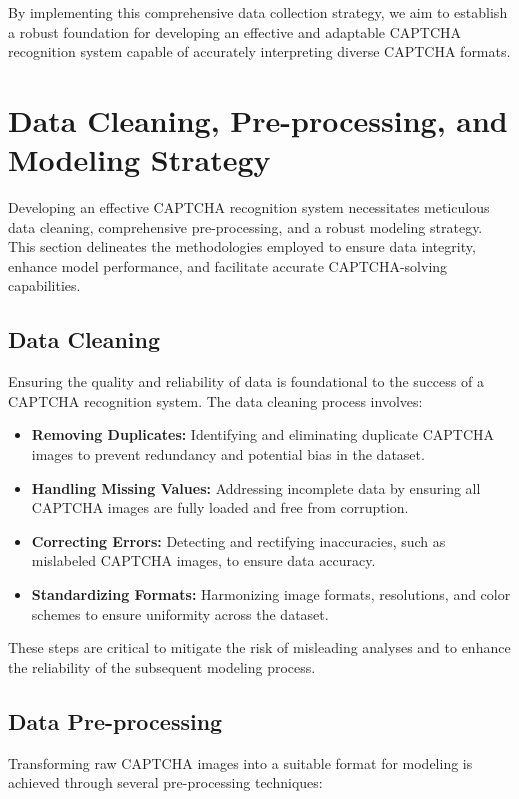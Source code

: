 \documentclass[sigconf]{acmart}
\begin{document}
By implementing this comprehensive data collection strategy, we aim to establish a robust foundation for developing an effective and adaptable CAPTCHA recognition system capable of accurately interpreting diverse CAPTCHA formats.

\section{Data Cleaning, Pre-processing, and Modeling Strategy}

Developing an effective CAPTCHA recognition system necessitates meticulous data cleaning, comprehensive pre-processing, and a robust modeling strategy. This section delineates the methodologies employed to ensure data integrity, enhance model performance, and facilitate accurate CAPTCHA-solving capabilities.

\subsection{Data Cleaning}

Ensuring the quality and reliability of data is foundational to the success of a CAPTCHA recognition system. The data cleaning process involves:

\begin{itemize} \item \textbf{Removing Duplicates:} Identifying and eliminating duplicate CAPTCHA images to prevent redundancy and potential bias in the dataset. \item \textbf{Handling Missing Values:} Addressing incomplete data by ensuring all CAPTCHA images are fully loaded and free from corruption. \item \textbf{Correcting Errors:} Detecting and rectifying inaccuracies, such as mislabeled CAPTCHA images, to ensure data accuracy. \item \textbf{Standardizing Formats:} Harmonizing image formats, resolutions, and color schemes to ensure uniformity across the dataset. \end{itemize}

These steps are critical to mitigate the risk of misleading analyses and to enhance the reliability of the subsequent modeling process.

\subsection{Data Pre-processing}

Transforming raw CAPTCHA images into a suitable format for modeling is achieved through several pre-processing techniques:
\end{document}
